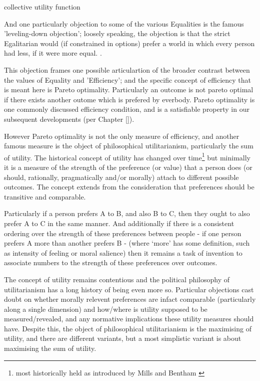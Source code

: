 collective utility function



And one particularly objection to some of the various Equalities is the famous 'leveling-down objection'; loosely speaking, the objection is that the strict Egalitarian would (if constrained in options) prefer a world in which every person had less, if it were more equal. \cite{temkin_2003, equalityandpriorityparfit}.

This objection frames one possible articulartion of the broader contrast between the values of Equality and 'Efficiency'; and the specific concept of efficiency that is meant here is Pareto optimality.
Particularly an outcome is not pareto optimal if there exists another outome which is prefered by everbody.
Pareto optimality is one commonly discussed efficiency condition, and is a satisfiable property in our subsequent developments (per Chapter \ref{}).

However Pareto optimality is not the only measure of efficiency, and another famous measure is the object of philosophical utilitarianism, particularly the sum of utility.
The historical concept of utility has changed over time\footnote{most historically held as introduced by Mills and Bentham\cite{} \cite{}} but minimally it is a measure of the strength of the preference (or value) that a person does (or should, rationally, pragmatically and/or morally) attach to different possible outcomes.
The concept extends from the consideration that preferences should be transitive and comparable.

Particularly if a person prefers A to B, and also B to C, then they ought to also prefer A to C in the same manner. And additionally if there is a consistent ordering over the strength of these preferences between people - if one person prefers A more than another prefers B - (where `more' has some definition, such as intensity of feeling or moral salience) then it remains a task of invention to associate numbers to the strength of these preferences over outcomes.

The concept of utility remains contentious and the political philosophy of utilitarianism has a long history of being even more so.
Particular objections cast doubt on whether morally relevent preferences are infact comparable (particularly along a single dimension) and how/where is utility supposed to be measured/revealed, and any normative implications these utility measures should have.
Despite this, the object of philosophical utilitarianism is the maximising of utility, and there are different variants, but a most simplistic variant is about maximising the sum of utility.

